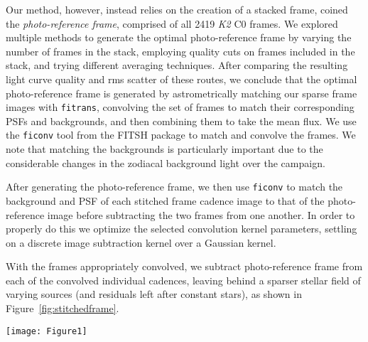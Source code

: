 \documentclass[apjl]{emulateapj}
\begin{document}
Our method, however, instead relies on the creation of a stacked frame,
coined the \textit{photo-reference frame}, comprised of all 2419
\textit{K2} C0 frames.  We explored multiple methods to generate the
optimal photo-reference frame by varying the number of frames in the
stack, employing quality cuts on frames included in the stack, and
trying different averaging techniques. After comparing the resulting
light curve quality and rms scatter of these routes, we conclude that
the optimal photo-reference frame is generated by astrometrically
matching our sparse frame images with \texttt{fitrans}, convolving the
set of frames to match their corresponding PSFs and backgrounds, and
then combining them to take the mean flux.  We use the \texttt{ficonv}
tool from the FITSH package to match and convolve the frames. We note
that matching the backgrounds is particularly important due to the
considerable changes in the zodiacal background light over the campaign.

After generating the photo-reference frame, we then use \texttt{ficonv}
to match the background and PSF of each stitched frame cadence image to
that of the photo-reference image before subtracting the two frames from
one another.  In order to properly do this we optimize the selected
convolution kernel parameters, settling on a discrete image subtraction
kernel over a Gaussian kernel.

With the frames appropriately convolved, we subtract photo-reference
frame from each of the convolved individual cadences, leaving behind a
sparser stellar field of varying sources (and residuals left after
constant stars), as shown in Figure~\ref{fig:stitchedframe}.

\begin{figure*}
  \centering
  \texttt{[image: Figure1]}
  \caption{$\textit{K2}$ Campaign 0 super-stamp containing open clusters
    M35 and NGC 2158. The figure is generated by stitching stamps within a
    given channel (channel 81 in this case) into a composite image. The
    empty regions represent null pixels, as the information from these
    pixels are not downloaded by the spacecraft. The left panel displays
    the raw composite frame before our image subtraction reduction
    pipeline is applied. The right panel is an example of a single
    subtracted frame for an arbitrary cadence. Variable sources remain in
    the subtracted frame as well as bright stars that are still visible
    due to saturation or Poisson noise.}
  \label{fig:stitchedframe}
\end{figure*}
\end{document}
